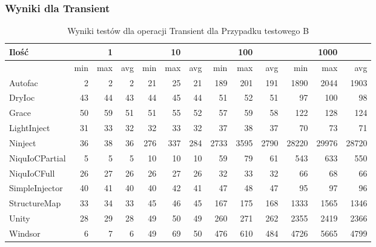 \documentclass[12pt]{article}
\begin{document}
\subsubsection{Wyniki dla Transient}
\begin{table}[H]
\captionsetup{belowskip=0pt,aboveskip=0pt}
\begin{center}
\begin{small}
	\begin{tabular}{ | l | r r r | r r r | r r r | r r r | }
    		\hline
Ilość & & 1 & & & 10 & & & 100 & & & 1000 & \\ \hline
 & min & max & avg & min & max & avg & min & max & avg & min & max & avg \\ \hline
Autofac & 2 & 2 & 2 & 21 & 25 & 21 & 189 & 201 & 191 & 1890 & 2044 & 1903 \\ \hline
DryIoc & 43 & 44 & 43 & 44 & 45 & 44 & 51 & 52 & 51 & 97 & 100 & 98 \\ \hline
Grace & 50 & 59 & 51 & 51 & 55 & 52 & 57 & 59 & 58 & 122 & 128 & 124 \\ \hline
LightInject & 31 & 33 & 32 & 32 & 33 & 32 & 37 & 38 & 37 & 70 & 73 & 71 \\ \hline
Ninject & 36 & 38 & 36 & 276 & 337 & 284 & 2733 & 3595 & 2790 & 28220 & 29976 & 28720 \\ \hline
NiquIoCPartial & 5 & 5 & 5 & 10 & 10 & 10 & 59 & 79 & 61 & 543 & 633 & 550 \\ \hline
NiquIoCFull & 26 & 27 & 26 & 26 & 27 & 26 & 32 & 33 & 32 & 66 & 68 & 66 \\ \hline
SimpleInjector & 40 & 41 & 40 & 40 & 42 & 41 & 47 & 48 & 47 & 95 & 97 & 96 \\ \hline
StructureMap & 33 & 34 & 33 & 45 & 46 & 45 & 167 & 175 & 168 & 1333 & 1565 & 1346 \\ \hline
Unity & 28 & 29 & 28 & 49 & 50 & 49 & 260 & 271 & 262 & 2355 & 2419 & 2366 \\ \hline
Windsor & 6 & 7 & 6 & 49 & 69 & 50 & 476 & 610 & 484 & 4726 & 5665 & 4799 \\ \hline
  	\end{tabular}
\end{small}
\end{center}
\caption{Wyniki testów dla operacji Transient dla Przypadku testowego B}
\label{TestCaseB_Transient}
\end{table}
\end{document}
